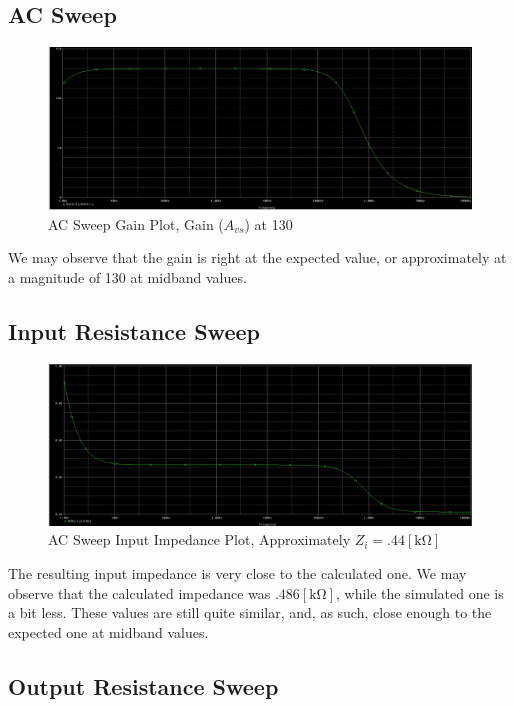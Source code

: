 \documentclass[
	letterpaper, %
	10pt, %
]{CSUniSchoolLabReport}
\begin{document}
\subsection{AC Sweep}

\begin{figure}[H]
  \centering
  \includegraphics[width=.9\textwidth]{Figures/HW89-PartE}
  \caption{AC Sweep Gain Plot, Gain ($A_{vs}$) at 130}
  \label{fig:7}
\end{figure}

We may observe that the gain is right at the expected value, or approximately at a magnitude of 130 at midband values.

\subsection{Input Resistance Sweep}

\begin{figure}[H]
  \centering
  \includegraphics[width=.9\textwidth]{Figures/HW89-PartF}
  \caption{AC Sweep Input Impedance Plot, Approximately $Z_i=.44[\si{\kilo\ohm}]$}
  \label{fig:8}
\end{figure}

The resulting input impedance is very close to the calculated one. We may observe that the calculated impedance was $.486[\si{\kilo\ohm}]$, while the simulated one is a bit less. These values are still quite similar, and, as such, close enough to the expected one at midband values.

\subsection{Output Resistance Sweep}
\end{document}
